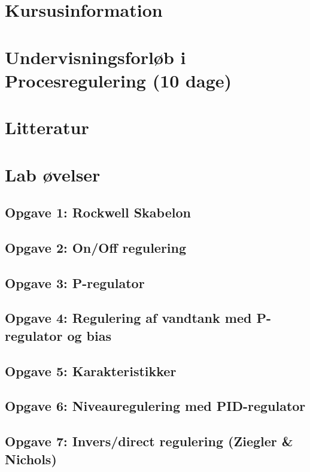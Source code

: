 \documentclass[12pt,a4paper]{article}
\begin{document}
	
	\section{Kursusinformation}
	\label{sec:kursusinformation}
	
	\section{Undervisningsforløb i Procesregulering (10 dage)}
	
	\clearpage
	\section{Litteratur}
	
	\clearpage
	\section{Lab øvelser}
	\subsection{Opgave 1: Rockwell Skabelon}
	\label{subsec:Opgave1}
	
	\subsection{Opgave 2: On/Off regulering}
	\label{subsec:Opgave2}
	
	\subsection{Opgave 3: P-regulator}
	\label{subsec:Opgave3}
	
	\subsection{Opgave 4: Regulering af vandtank med P-regulator og bias}
	\label{subsec:Opgave4}
	
	\subsection{Opgave 5: Karakteristikker}
	\label{subsec:Opgave5}
	
	\subsection{Opgave 6: Niveauregulering med PID-regulator}
	\label{subsec:Opgave6}
	
	\subsection{Opgave 7: Invers/direct regulering (Ziegler \& Nichols)}
	\label{subsec:Opgave7}
	
\end{document}
